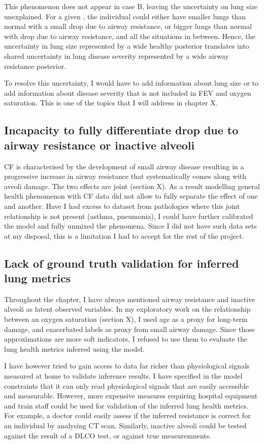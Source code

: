 This phenomenon does not appear in case B, leaving the uncertainty on lung size unexplained. For a given \F, the individual could either have smaller lungs than normal with a small drop due to airway resistance, or bigger lungs than normal with drop due to airway resistance, and all the situations in between. Hence, the uncertainty in lung size represented by a wide healthy \F posterior translates into shared uncertainty in lung disease severity represented by a wide airway resistance posterior.

To resolve this uncertainty, I would have to add information about lung size or to add information about disease severity that is not included in FEV and oxygen saturation. This is one of the topics that I will address in chapter X.

\subsection{Incapacity to fully differentiate \SP drop due to airway resistance or inactive alveoli}
CF is characterised by the development of small airway disease resulting in a progressive increase in airway resistance that systematically comes along with aveoli damage. The two effects are joint (section X). As a result modelling general health phenomenon with CF data did not allow to fully separate the effect of one and another. Have I had excess to dataset from pathologies where this joint relationship is not present (asthma, pneumonia), I could have further calibrated the model and fully unmixed the phenomena. Since I did not have such data sets at my disposal, this is a limitation I had to accept for the rest of the project.

\subsection{Lack of ground truth validation for inferred lung metrics}
Throughout the chapter, I have always mentioned airway resistance and inactive alveoli as latent observed variables. In my exploratory work on the relationship between \F an oxygen saturation (section X), I used age as a proxy for long-term damage, and exacerbated labels as proxy from small airway damage. Since those approximations are more soft indicators, I refused to use them to evaluate the lung health metrics inferred using the model.

I have however tried to gain access to data far richer than physiological signals measured at home to validate inference results. I have specified in the model constraints that it can only read physiological signals that are easily accessible and measurable. However, more expensive measures requiring hospital equipment and train staff could be used for validation of the inferred lung health metrics. For example, a doctor could easily assess if the inferred resistance is correct for an individual by analysing CT scan. Similarly, inactive alveoli could be tested against the result of a DLCO test, or against true \PA measuremnents.

